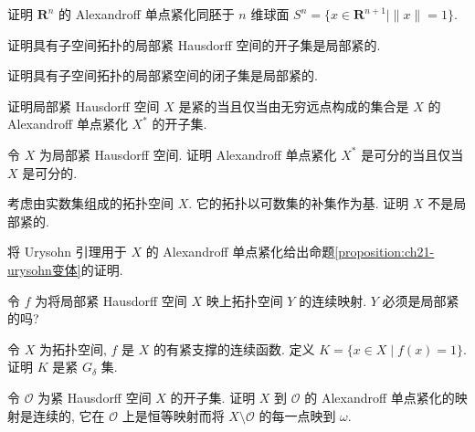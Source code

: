 \documentclass[../../main.tex]{subfiles}
\begin{document}
\begin{exercise}\label{exercise:ch21-04}
证明 $\mathbf{R}^{n}$ 的 Alexandroff 单点紧化同胚于 $n$ 维球面 $S^{n}=\{x\in\mathbf{R}^{n+1}\mid\|x\|=1\}$.
\end{exercise}

\begin{exercise}\label{exercise:ch21-05}
证明具有子空间拓扑的局部紧 Hausdorff 空间的开子集是局部紧的.
\end{exercise}

\begin{exercise}\label{exercise:ch21-06}
证明具有子空间拓扑的局部紧空间的闭子集是局部紧的.
\end{exercise}

\begin{exercise}\label{exercise:ch21-07}
证明局部紧 Hausdorff 空间 $X$ 是紧的当且仅当由无穷远点构成的集合是 $X$ 的 Alexandroff 单点紧化 $X^{*}$ 的开子集.
\end{exercise}

\begin{exercise}\label{exercise:ch21-08}
令 $X$ 为局部紧 Hausdorff 空间. 证明 Alexandroff 单点紧化 $X^{*}$ 是可分的当且仅当 $X$ 是可分的.
\end{exercise}

\begin{exercise}\label{exercise:ch21-09}
考虑由实数集组成的拓扑空间 $X$. 它的拓扑以可数集的补集作为基. 证明 $X$ 不是局部紧的.
\end{exercise}

\begin{exercise}\label{exercise:ch21-10}
将 Urysohn 引理用于 $X$ 的 Alexandroff 单点紧化给出命题\cref{proposition:ch21-urysohn变体}的证明.
\end{exercise}

\begin{exercise}\label{exercise:ch21-11}
令 $f$ 为将局部紧 Hausdorff 空间 $X$ 映上拓扑空间 $Y$ 的连续映射. $Y$ 必须是局部紧的吗?
\end{exercise}

\begin{exercise}\label{exercise:ch21-12}
令 $X$ 为拓扑空间, $f$ 是 $X$ 的有紧支撑的连续函数. 定义 $K=\{x\in X\mid f(x)=1\}$. 证明 $K$ 是紧 $G_{\delta}$ 集.
\end{exercise}

\begin{exercise}\label{exercise:ch21-13}
令 $\mathcal{O}$ 为紧 Hausdorff 空间 $X$ 的开子集. 证明 $X$ 到 $\mathcal{O}$ 的 Alexandroff 单点紧化的映射是连续的, 它在 $\mathcal{O}$ 上是恒等映射而将 $X\setminus\mathcal{O}$ 的每一点映到 $\omega$.
\end{exercise}
\end{document}
